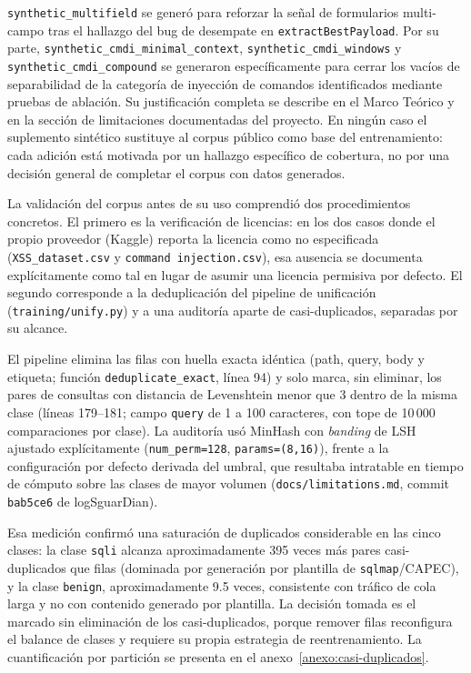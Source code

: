 \texttt{synthetic\_multifield} se generó para reforzar la señal de formularios multi-campo tras el hallazgo del bug de desempate en \texttt{extractBestPayload}. Por su parte, \texttt{synthetic\_cmdi\_minimal\_context}, \texttt{synthetic\_cmdi\_windows} y \texttt{synthetic\_cmdi\_compound} se generaron específicamente para cerrar los vacíos de separabilidad de la categoría de inyección de comandos identificados mediante pruebas de ablación. Su justificación completa se describe en el Marco Teórico y en la sección de limitaciones documentadas del proyecto. En ningún caso el suplemento sintético sustituye al corpus público como base del entrenamiento: cada adición está motivada por un hallazgo específico de cobertura, no por una decisión general de completar el corpus con datos generados.

La validación del corpus antes de su uso comprendió dos procedimientos concretos. El primero es la verificación de licencias: en los dos casos donde el propio proveedor (Kaggle) reporta la licencia como no especificada (\texttt{XSS\_dataset.csv} y \texttt{command injection.csv}), esa ausencia se documenta explícitamente como tal en lugar de asumir una licencia permisiva por defecto. El segundo corresponde a la deduplicación del pipeline de unificación (\texttt{training/\allowbreak unify.py}) y a una auditoría aparte de casi-duplicados, separadas por su alcance.

El pipeline elimina las filas con huella exacta idéntica (path, query, body y etiqueta; función \texttt{deduplicate\_exact}, línea 94) y solo marca, sin eliminar, los pares de consultas con distancia de Levenshtein menor que 3 dentro de la misma clase (líneas 179--181; campo \texttt{query} de 1 a 100 caracteres, con tope de 10\,000 comparaciones por clase). La auditoría usó MinHash\parencite{broder1997} con \textit{banding} de LSH ajustado explícitamente (\texttt{num\_perm=128}, \texttt{params=(8,16)}), frente a la configuración por defecto derivada del umbral, que resultaba intratable en tiempo de cómputo sobre las clases de mayor volumen (\texttt{docs/limitations.md}, commit \texttt{bab5ce6} de logSguarDian).

Esa medición confirmó una saturación de duplicados considerable en las cinco clases: la clase \texttt{sqli} alcanza aproximadamente 395 veces más pares casi-duplicados que filas (dominada por generación por plantilla de \texttt{sqlmap}/CAPEC), y la clase \texttt{benign}, aproximadamente 9.5 veces, consistente con tráfico de cola larga y no con contenido generado por plantilla. La decisión tomada es el marcado sin eliminación de los casi-duplicados, porque remover filas reconfigura el balance de clases y requiere su propia estrategia de reentrenamiento. La cuantificación por partición se presenta en el anexo~\ref{anexo:casi-duplicados}.

